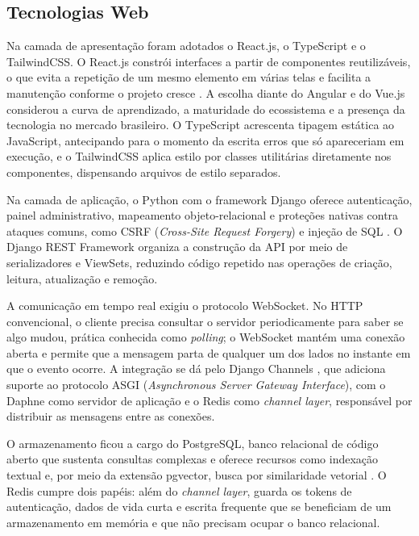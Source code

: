 \subsection{Tecnologias Web}

Na camada de apresentação foram adotados o React.js, o TypeScript e o TailwindCSS. O React.js constrói interfaces a partir de componentes reutilizáveis, o que evita a repetição de um mesmo elemento em várias telas e facilita a manutenção conforme o projeto cresce \citep{react2024}. A escolha diante do Angular e do Vue.js considerou a curva de aprendizado, a maturidade do ecossistema e a presença da tecnologia no mercado brasileiro. O TypeScript acrescenta tipagem estática ao JavaScript, antecipando para o momento da escrita erros que só apareceriam em execução, e o TailwindCSS aplica estilo por classes utilitárias diretamente nos componentes, dispensando arquivos de estilo separados.

Na camada de aplicação, o Python com o framework Django oferece autenticação, painel administrativo, mapeamento objeto-relacional e proteções nativas contra ataques comuns, como CSRF (\textit{Cross-Site Request Forgery}) e injeção de SQL \citep{django2024}. O Django REST Framework organiza a construção da API por meio de serializadores e ViewSets, reduzindo código repetido nas operações de criação, leitura, atualização e remoção.

A comunicação em tempo real exigiu o protocolo WebSocket. No HTTP convencional, o cliente precisa consultar o servidor periodicamente para saber se algo mudou, prática conhecida como \textit{polling}; o WebSocket mantém uma conexão aberta e permite que a mensagem parta de qualquer um dos lados no instante em que o evento ocorre. A integração se dá pelo Django Channels \citep{channels2024}, que adiciona suporte ao protocolo ASGI (\textit{Asynchronous Server Gateway Interface}), com o Daphne como servidor de aplicação e o Redis como \textit{channel layer}, responsável por distribuir as mensagens entre as conexões.

O armazenamento ficou a cargo do PostgreSQL, banco relacional de código aberto que sustenta consultas complexas e oferece recursos como indexação textual e, por meio da extensão pgvector, busca por similaridade vetorial \citep{postgresql2024}. O Redis cumpre dois papéis: além do \textit{channel layer}, guarda os tokens de autenticação, dados de vida curta e escrita frequente que se beneficiam de um armazenamento em memória e que não precisam ocupar o banco relacional.
